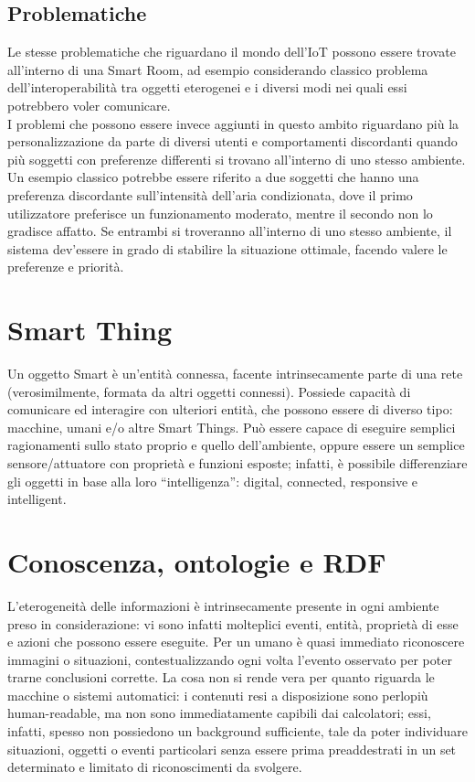 \documentclass[12pt,a4paper,openright,oneside]{report}
\newcommand{\quotes}[1]{``#1''}
\begin{document}
\subsection{Problematiche}
Le stesse problematiche che riguardano il mondo dell'IoT possono essere trovate all'interno di una Smart Room, ad esempio considerando classico problema dell'interoperabilità tra oggetti eterogenei e i diversi modi nei quali essi potrebbero voler comunicare.\\

I problemi che possono essere invece aggiunti in questo ambito riguardano più la personalizzazione da parte di diversi utenti e comportamenti discordanti quando più soggetti con preferenze differenti si trovano all'interno di uno stesso ambiente. Un esempio classico potrebbe essere riferito a due soggetti che hanno una preferenza discordante sull'intensità dell'aria condizionata, dove il primo utilizzatore preferisce un funzionamento moderato, mentre il secondo non lo gradisce affatto. Se entrambi si troveranno all'interno di uno stesso ambiente, il sistema dev'essere in grado di stabilire la situazione ottimale, facendo valere le preferenze e priorità.\\


\section{Smart Thing}
\label{sec:smart_thing}
Un oggetto Smart \cite{smartthing} è un'entità connessa, facente intrinsecamente parte di una rete (verosimilmente, formata da altri oggetti connessi). Possiede capacità di comunicare ed interagire con ulteriori entità, che possono essere di diverso tipo: macchine, umani e/o altre Smart Things. Può essere capace di eseguire semplici ragionamenti sullo stato proprio e quello dell'ambiente, oppure essere un semplice sensore/attuatore con proprietà e funzioni esposte; infatti, è possibile differenziare gli oggetti in base alla loro \quotes{intelligenza}: digital, connected, responsive e intelligent.


\section{Conoscenza, ontologie e RDF}
L'eterogeneità delle informazioni è intrinsecamente presente in ogni ambiente preso in considerazione: vi sono infatti molteplici eventi, entità, proprietà di esse e azioni che possono essere eseguite. Per un umano è quasi immediato riconoscere immagini o situazioni, contestualizzando ogni volta l'evento osservato per poter trarne conclusioni corrette. La cosa non si rende vera per quanto riguarda le macchine o sistemi automatici: i contenuti resi a disposizione sono perlopiù human-readable, ma non sono immediatamente capibili dai calcolatori; essi, infatti, spesso non possiedono un background sufficiente, tale da poter individuare situazioni, oggetti o eventi particolari senza essere prima preaddestrati in un set determinato e limitato di riconoscimenti da svolgere.\\
\end{document}
